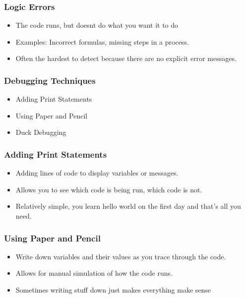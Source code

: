 \documentclass[aspectratio=169,hyperref={unicode}]{beamer}
\begin{document}
\begin{frame}[fragile]



\end{frame}

\begin{frame}
\frametitle{Logic Errors}
\begin{itemize}
\item The code runs, but doesnt do what you want it to do
\item Examples: Incorrect formulas, missing steps in a process.
\item Often the hardest to detect because there are no explicit error messages.
\end{itemize}
\end{frame}

\begin{frame}
\frametitle{Debugging Techniques}
\begin{itemize}
\item Adding Print Statements
\item Using Paper and Pencil
\item Duck Debugging
\end{itemize}
\end{frame}

\begin{frame}
\frametitle{Adding Print Statements}
\begin{itemize}
\item Adding lines of code to display variables or messages.
  \item Allows you to see which code is being run, which code is not.
    \item  Relatively simple, you learn hello world on the first day and that's all you need.
\end{itemize}
\end{frame}

\begin{frame}
\frametitle{Using Paper and Pencil}
\begin{itemize}
\item Write down variables and their values as you trace through the code.
\item Allows for manual simulation of how the code runs.
\item Sometimes writing stuff down just makes everything make sense
\end{itemize}
\end{frame}
\end{document}
